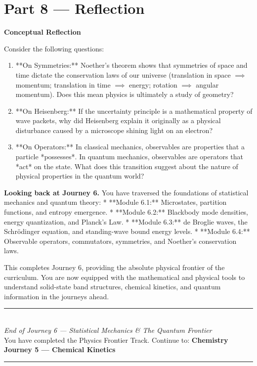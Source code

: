 \documentclass[12pt, a4paper, twoside]{book}
\begin{document}
\newpage

\section{Part 8 --- Reflection}

\begin{reflectionbox}
\textbf{Conceptual Reflection}

Consider the following questions:
\begin{enumerate}
  \item **On Symmetries:** Noether's theorem shows that symmetries of space and time dictate the conservation laws of our universe (translation in space $\implies$ momentum; translation in time $\implies$ energy; rotation $\implies$ angular momentum). Does this mean physics is ultimately a study of geometry?
  \item **On Heisenberg:** If the uncertainty principle is a mathematical property of wave packets, why did Heisenberg explain it originally as a physical disturbance caused by a microscope shining light on an electron?
  \item **On Operators:** In classical mechanics, observables are properties that a particle *possesses*. In quantum mechanics, observables are operators that *act* on the state. What does this transition suggest about the nature of physical properties in the quantum world?
\end{enumerate}
\end{reflectionbox}

\medskip
\noindent\textbf{Looking back at Journey 6.}
You have traversed the foundations of statistical mechanics and quantum theory:
* **Module 6.1:** Microstates, partition functions, and entropy emergence.
* **Module 6.2:** Blackbody mode densities, energy quantization, and Planck's Law.
* **Module 6.3:** de Broglie waves, the Schrödinger equation, and standing-wave bound energy levels.
* **Module 6.4:** Observable operators, commutators, symmetries, and Noether's conservation laws.

This completes Journey 6, providing the absolute physical frontier of the curriculum. You are now equipped with the mathematical and physical tools to understand solid-state band structures, chemical kinetics, and quantum information in the journeys ahead.

\vspace{1.4cm}
\begin{center}
{\color{teal}\rule{0.5\linewidth}{0.8pt}}\\[6pt]
{\small\color{deep}\textit{End of Journey 6 --- Statistical Mechanics & The Quantum Frontier}}\\[4pt]
{\small\color{deep}You have completed the Physics Frontier Track. Continue to: \textbf{Chemistry Journey 5 --- Chemical Kinetics}}\\[6pt]
{\color{teal}\rule{0.5\linewidth}{0.8pt}}
\end{center}
\end{document}
